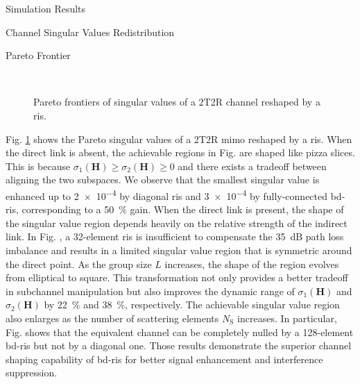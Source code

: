 \documentclass[journal]{IEEEtran}
\begin{document}
\begin{section}{Simulation Results}
	\begin{subsection}{Channel Singular Values Redistribution}
		\begin{subsubsection}{Pareto Frontier}
			\begin{figure}[!t]
				\centering
				\\
				\caption{Pareto frontiers of singular values of a 2T2R channel reshaped by a \gls{ris}.}
				\label{fg:singular_pareto}
			\end{figure}
			Fig. \ref{fg:singular_pareto} shows the Pareto singular values of a 2T2R \gls{mimo} reshaped by a \gls{ris}.
			When the direct link is absent, the achievable regions in Fig.  are shaped like pizza slices.
			This is because $\sigma_1(\mathbf{H}) \ge \sigma_2(\mathbf{H}) \ge 0$ and there exists a tradeoff between aligning the two subspaces.
			We observe that the smallest singular value is enhanced up to \num{2e-4} by diagonal \gls{ris} and \num{3e-4} by fully-connected \gls{bd}-\gls{ris}, corresponding to a \qty{50}{\percent} gain.
			When the direct link is present, the shape of the singular value region depends heavily on the relative strength of the indirect link.
			In Fig. , a 32-element \gls{ris} is insufficient to compensate the \qty{35}{dB} path loss imbalance and results in a limited singular value region that is symmetric around the direct point.
			As the group size $L$ increases, the shape of the region evolves from elliptical to square.
			This transformation not only provides a better tradeoff in subchannel manipulation but also improves the dynamic range of $\sigma_1(\mathbf{H})$ and $\sigma_2(\mathbf{H})$ by \qty{22}{\percent} and \qty{38}{\percent}, respectively.
			The achievable singular value region also enlarges as the number of scattering elements $N_\mathrm{S}$ increases.
			In particular, Fig.  shows that the equivalent channel can be completely nulled by a 128-element \gls{bd}-\gls{ris} but not by a diagonal one.
			Those results demonstrate the superior channel shaping capability of \gls{bd}-\gls{ris} for better signal enhancement and interference suppression.
		\end{subsubsection}


\end{subsection}
\end{section}
\end{document}
